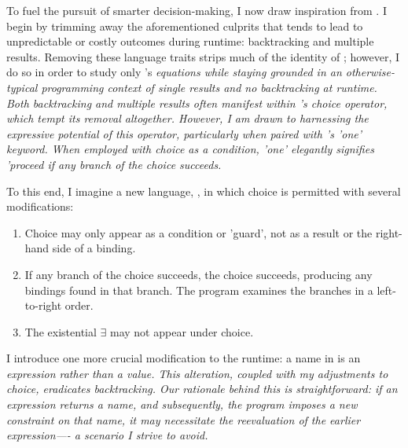 \documentclass[manuscript,screen,review, 12pt, nonacm]{acmart}
\begin{document}
        To fuel the pursuit of smarter decision-making, I now draw inspiration
        from \VC. I begin by trimming away the aforementioned culprits that
        tends to lead to unpredictable or costly outcomes during runtime:
        backtracking and multiple results. Removing these language traits strips
        much of the identity of \VC; however, I do so in order to study only
        \VC's \it{equations} while staying grounded in an otherwise-typical
        programming context of single results and no backtracking at runtime.
        Both backtracking and multiple results often manifest within \VC's
        choice operator, which tempt its removal altogether. However, I am drawn
        to harnessing the expressive potential of this operator, particularly
        when paired with \VC's 'one' keyword. When employed with choice as a
        condition, 'one' elegantly signifies 'proceed if any branch of the
        choice succeeds. 
        
        To this end, I imagine a new language, \VMinus, in which choice is
        permitted with several modifications:

        \begin{enumerate}
        \item Choice may only appear as a condition or 'guard', not as a result
        or the right-hand side of a binding.
        \item If any branch of the choice succeeds, the choice succeeds,
        producing any bindings found in that branch. The program examines the
        branches in a left-to-right order.
        \item The existential $\exists$ may not appear under choice.
        \end{enumerate}

        I introduce one more crucial modification to the \VC runtime: a name in
        \VMinus is an \it{expression} rather than a \it{value}. This alteration,
        coupled with my adjustments to choice, eradicates backtracking. Our
        rationale behind this is straightforward: if an expression returns a
        name, and subsequently, the program imposes a new constraint on that
        name, it may necessitate the reevaluation of the earlier expression—- a
        scenario I strive to avoid. 
        


        
\end{document}
